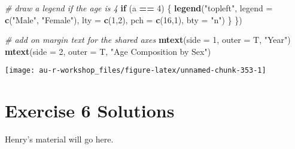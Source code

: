 \documentclass[]{book}
\newenvironment{Shaded}{\begin{snugshade}}{\end{snugshade}}
\newcommand{\KeywordTok}[1]{\textcolor[rgb]{0.13,0.29,0.53}{\textbf{#1}}}
\newcommand{\DataTypeTok}[1]{\textcolor[rgb]{0.13,0.29,0.53}{#1}}
\newcommand{\DecValTok}[1]{\textcolor[rgb]{0.00,0.00,0.81}{#1}}
\newcommand{\StringTok}[1]{\textcolor[rgb]{0.31,0.60,0.02}{#1}}
\newcommand{\CommentTok}[1]{\textcolor[rgb]{0.56,0.35,0.01}{\textit{#1}}}
\newcommand{\ControlFlowTok}[1]{\textcolor[rgb]{0.13,0.29,0.53}{\textbf{#1}}}
\newcommand{\OperatorTok}[1]{\textcolor[rgb]{0.81,0.36,0.00}{\textbf{#1}}}
\newcommand{\NormalTok}[1]{#1}
\theoremstyle{definition}
\theoremstyle{definition}
\theoremstyle{definition}
\theoremstyle{remark}
\begin{document}
\begin{Shaded}
\begin{Highlighting}[]
  \CommentTok{# draw a legend if the age is 4}
  \ControlFlowTok{if}\NormalTok{ (a }\OperatorTok{==}\StringTok{ }\DecValTok{4}\NormalTok{) \{}
    \KeywordTok{legend}\NormalTok{(}\StringTok{"topleft"}\NormalTok{, }\DataTypeTok{legend =} \KeywordTok{c}\NormalTok{(}\StringTok{"Male"}\NormalTok{, }\StringTok{"Female"}\NormalTok{),}
           \DataTypeTok{lty =} \KeywordTok{c}\NormalTok{(}\DecValTok{1}\NormalTok{,}\DecValTok{2}\NormalTok{), }\DataTypeTok{pch =} \KeywordTok{c}\NormalTok{(}\DecValTok{16}\NormalTok{,}\DecValTok{1}\NormalTok{), }\DataTypeTok{bty =} \StringTok{"n"}\NormalTok{)}
\NormalTok{  \}}
\NormalTok{\})}

\CommentTok{# add on margin text for the shared axes}
\KeywordTok{mtext}\NormalTok{(}\DataTypeTok{side =} \DecValTok{1}\NormalTok{, }\DataTypeTok{outer =}\NormalTok{ T, }\StringTok{"Year"}\NormalTok{)}
\KeywordTok{mtext}\NormalTok{(}\DataTypeTok{side =} \DecValTok{2}\NormalTok{, }\DataTypeTok{outer =}\NormalTok{ T, }\StringTok{"Age Composition by Sex"}\NormalTok{)}
\end{Highlighting}
\end{Shaded}

\begin{center}\texttt{[image: au-r-workshop\_files/figure-latex/unnamed-chunk-353-1]} \end{center}

\section*{Exercise 6 Solutions}\label{ex6-answers}

Henry's material will go here.


\end{document}
